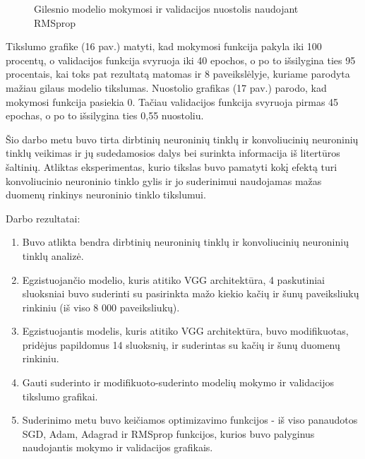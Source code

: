\documentclass{VUMIFPSkursinis}
\begin{document}
\begin{figure}[!htbp]
\begin{minipage}[b]{0.49\textwidth}
    \caption{Gilesnio modelio mokymosi ir validacijos nuostolis naudojant RMSprop}
  \end{minipage}
\end{figure}

Tikslumo grafike (16 pav.) matyti, kad mokymosi funkcija pakyla iki 100 procentų, o validacijos funkcija svyruoja iki 40 epochos, o po to išsilygina ties 95 procentais, kai toks pat rezultatą matomas ir 8 paveikslėlyje, kuriame parodyta mažiau gilaus modelio tikslumas.
Nuostolio grafikas (17 pav.) parodo, kad mokymosi funkcija pasiekia 0. Tačiau validacijos funkcija svyruoja pirmas 45 epochas, o po to išsilygina ties 0,55 nuostoliu.

Šio darbo metu buvo tirta dirbtinių neuroninių tinklų ir konvoliucinių neuroninių tinklų veikimas ir jų sudedamosios dalys bei surinkta informacija iš litertūros šaltinių. Atliktas eksperimentas, kurio tikslas buvo pamatyti kokį efektą turi konvoliucinio neuroninio tinklo gylis ir jo suderinimui naudojamas mažas duomenų rinkinys neuroninio tinklo tikslumui.


Darbo rezultatai:
\begin{enumerate}
\item Buvo atlikta bendra dirbtinių neuroninių tinklų ir konvoliucinių neuroninių tinklų analizė.
\item Egzistuojančio modelio, kuris atitiko VGG architektūra, 4 paskutiniai sluoksniai buvo suderinti su pasirinkta mažo kiekio kačių ir šunų paveiksliukų rinkiniu (iš viso 8 000 paveiksliukų).
\item Egzistuojantis modelis, kuris atitiko VGG architektūra, buvo modifikuotas, pridėjus papildomus 14 sluoksnių, ir suderintas su kačių ir šunų duomenų rinkiniu.
\item Gauti suderinto ir modifikuoto-suderinto modelių mokymo ir validacijos tikslumo grafikai.
\item Suderinimo metu buvo keičiamos optimizavimo funkcijos - iš viso panaudotos SGD, Adam, Adagrad ir RMSprop funkcijos, kurios buvo palyginus naudojantis mokymo ir validacijos grafikais.
\end{enumerate}

\end{document}
